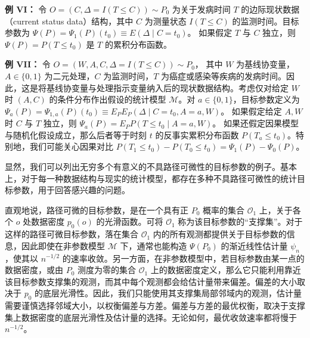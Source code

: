 \noindent\textbf{例 VI：}\enspace
令 $O=(C,\Delta=I(T\leq C))\sim P_0$ 为关于发病时间 $T$ 的边际现状数据（current status data）结构，其中 $C$ 为测量状态 $I(T\leq C)$ 的监测时间。目标参数为
$\Psi(P)=\Psi_1(P)(t_0)\equiv E(\Delta\mid C=t_0)$。
如果假定 $T$ 与 $C$ 独立，则 $\Psi(P)=P(T\leq t_0)$ 是 $T$ 的累积分布函数。

\noindent\textbf{例 VII：}\enspace
令 $O=(W,A,C,\Delta=I(T\leq C))\sim P_0$，
其中 $W$ 为基线协变量，$A\in\{0,1\}$ 为二元处理，$C$ 为监测时间，$T$ 为癌症或感染等疾病的发病时间。因此，这是将基线协变量与处理指示变量纳入后的现状数据结构。考虑仅对给定 $W$ 时 $(A,C)$ 的条件分布作出假设的统计模型 $\mathcal M$。对 $a\in\{0,1\}$，目标参数定义为
$\Psi_a(P)=\Psi_{1,a}(P)(t_0)\equiv E_PE_P(\Delta\mid C=t_0,A=a,W)$。
如果假定给定 $A,W$ 时 $C$ 与 $T$ 独立，则
$\Psi_a(P)=E_PP(T\leq t_0\mid A=a,W)$。
如果还假定因果模型与随机化假设成立，那么后者等于时刻 $t$ 的反事实累积分布函数 $P(T_a\leq t_0)$。特别地，我们可能关心因果对比
$P(T_1\leq t_0)-P(T_0\leq t_0)=\Psi_1(P)-\Psi_0(P)$。

显然，我们可以列出无穷多个有意义的不具路径可微性的目标参数的例子。基本上，对于每一种数据结构与现实的统计模型，都存在多种不具路径可微性的统计目标参数，用于回答感兴趣的问题。

直观地说，路径可微的目标参数，是在一个具有正 $P_0$ 概率的集合 $\mathcal O_1$ 上，关于各个 $o$ 处数据密度 $p_0(o)$ 的光滑函数。可将 $\mathcal O_1$ 称为该目标参数的“支撑集”。对于这样的路径可微目标参数，落在集合 $\mathcal O_1$ 内的所有观测都提供关于目标参数的信息，因此即使在非参数模型 $\mathcal M$ 下，通常也能构造 $\Psi(P_0)$ 的渐近线性估计量 $\psi_n$，使其以 $n^{-1/2}$ 的速率收敛。另一方面，在非参数模型中，若目标参数由某一点的数据密度，或由 $P_0$ 测度为零的集合 $\mathcal O_1$ 上的数据密度定义，那么它只能利用靠近该目标参数支撑集的观测，而其中每个观测都会给估计量带来偏差。偏差的大小取决于 $p_0$ 的底层光滑性。因此，我们只能使用其支撑集局部邻域内的观测，估计量需要谨慎选择邻域大小，以权衡偏差与方差。偏差与方差的最优权衡，取决于支撑集上数据密度的底层光滑性及估计量的选择。无论如何，最优收敛速率都将慢于 $n^{-1/2}$。
